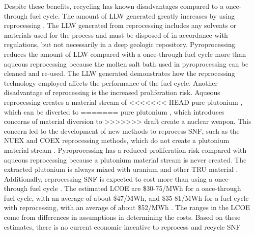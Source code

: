 Despite these benefits, recycling has known disadvantages compared to 
a once-through fuel cycle.
The amount of \gls{LLW} generated greatly increases by using 
reprocessing \cite{widder_benefits_2010}. The \gls{LLW} generated 
from reprocessing includes any solvents or materials used for the process 
and must be disposed of in accordance with regulations, but not 
necessarily in a deep geologic repository.
Pyroprocessing reduces the amount of \gls{LLW} compared with 
a once-through fuel cycle more than aqueous reprocessing because
the molten salt bath used in pyroprocessing can be cleaned 
and re-used. The \gls{LLW} generated demonstrates how the reprocessing 
technology employed affects the performance of the fuel cycle. 
Another disadvantage of reprocessing is the increased proliferation 
risk. Aqueous reprocessing creates a material stream of 
<<<<<<< HEAD
pure plutonium \cite{widder_benefits_2010}, which can be diverted to 
=======
pure plutonium \cite{widder_benefits_2010}, which introduces 
concerns of material diversion to 
>>>>>>> draft
create a nuclear weapon. This concern led to the development of new 
methods to reprocess \gls{SNF}, such as the NUEX and COEX reprocessing 
methods, which do not create a plutonium material stream 
\cite{widder_benefits_2010}. 
Pyroprocessing has a reduced proliferation risk compared with 
aqueous reprocessing
because a plutonium material stream is never created. The extracted 
plutonium is always mixed with uranium and other \gls{TRU} material 
\cite{noauthor_status_2021}.
Additionally, reprocessing \gls{SNF} is expected to cost more than 
using a once-through fuel cycle \cite{rodriguez-penalonga_review_2017,widder_benefits_2010}. 
The estimated 
\gls{LCOE} are \$30-75/MWh for a once-through fuel cycle, with an 
average of about \$47/MWh, and \$35-81/MWh for a fuel 
cycle with reprocessing, with an average of about \$52/MWh 
\cite{widder_benefits_2010}. The ranges in the \gls{LCOE} come from 
differences in assumptions in determining the costs. Based on these 
estimates, there is no current economic incentive to reprocess and recycle 
\gls{SNF}

